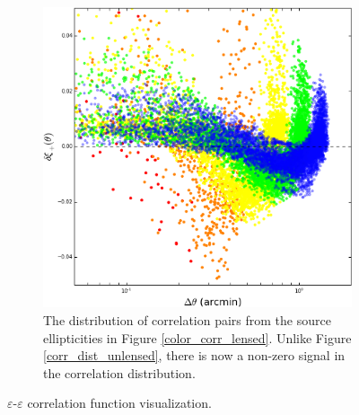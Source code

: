 \documentclass[%
 reprint,
 amsmath,amssymb,
 aps,nofootinbib
]{revtex4-1}
\begin{document}
\begin{figure}
\begin{subfigure}{0.425\textwidth}
        \includegraphics[width=\textwidth]{figs-swe/corr_dist_lensed.png}
        \captionsetup{justification=raggedright,singlelinecheck=false}
        \caption{The distribution of correlation pairs from the source ellipticities in Figure \ref{color_corr_lensed}. Unlike Figure \ref{corr_dist_unlensed}, there is now a non-zero signal in the correlation distribution.}
        \label{corr_dist_lensed}
    \end{subfigure}
    \vspace{-.05in}
    \caption{$\varepsilon$-$\varepsilon$ correlation function visualization.}
    \label{colored_corr}
\end{figure}
\end{document}
